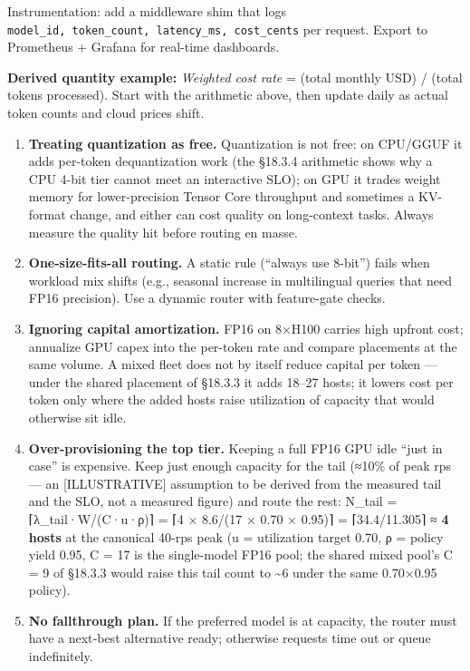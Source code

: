 Instrumentation: add a middleware shim that logs
\texttt{model\_id,\ token\_count,\ latency\_ms,\ cost\_cents} per
request. Export to Prometheus + Grafana for real-time dashboards.

\textbf{Derived quantity example:} \emph{Weighted cost rate} = (total
monthly USD) / (total tokens processed). Start with the arithmetic
above, then update daily as actual token counts and cloud prices shift.

\label{common-mistakes}


\begin{enumerate}
\def\labelenumi{\arabic{enumi}.}
\tightlist
\item
  \textbf{Treating quantization as free.} Quantization is not free: on
  CPU/GGUF it adds per-token dequantization work (the §18.3.4 arithmetic
  shows why a CPU 4-bit tier cannot meet an interactive SLO); on GPU it
  trades weight memory for lower-precision Tensor Core throughput and
  sometimes a KV-format change, and either can cost quality on
  long-context tasks. Always measure the quality hit before routing en
  masse.
\item
  \textbf{One-size-fits-all routing.} A static rule (``always use
  8-bit'') fails when workload mix shifts (e.g., seasonal increase in
  multilingual queries that need FP16 precision). Use a dynamic router
  with feature-gate checks.
\item
  \textbf{Ignoring capital amortization.} FP16 on 8×H100 carries high
  upfront cost; annualize GPU capex into the per-token rate and compare
  placements at the same volume. A mixed fleet does not by itself reduce
  capital per token --- under the shared placement of §18.3.3 it adds
  18--27 hosts; it lowers cost per token only where the added hosts
  raise utilization of capacity that would otherwise sit idle.
\item
  \textbf{Over-provisioning the top tier.} Keeping a full FP16 GPU idle
  ``just in case'' is expensive. Keep just enough capacity for the tail
  (≈10\% of peak rps --- an \mbox{{[}ILLUSTRATIVE{]}} assumption to be derived
  from the measured tail and the SLO, not a measured figure) and route
  the rest: N\_tail = ⌈λ\_tail·W/(C·u·ρ)⌉ = ⌈4 × 8.6/(17 × 0.70 × 0.95)⌉
  = ⌈34.4/11.305⌉ ≈ \textbf{4 hosts} at the canonical 40-rps peak (u =
  utilization target 0.70, ρ = policy yield 0.95, C = 17 is the
  single-model FP16 pool; the shared mixed pool's C = 9 of §18.3.3 would
  raise this tail count to \textasciitilde6 under the same 0.70×0.95
  policy).
\item
  \textbf{No fallthrough plan.} If the preferred model is at capacity,
  the router must have a next‑best alternative ready; otherwise requests
  time out or queue indefinitely.
\end{enumerate}

